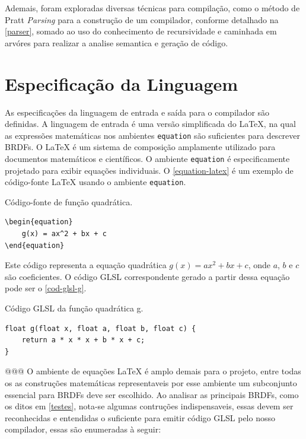 Ademais, foram exploradas diversas técnicas para compilação, como o método de Pratt \textit{Parsing} para a construção de um compilador, conforme detalhado na \autoref{parser}, somado ao uso do conhecimento de recursividade e caminhada em arvóres para realizar a analise semantica e geração de código.


\section{Especificação da Linguagem}\label{especificacao-linguagem}

As especificações da linguagem de entrada e saída para o compilador são definidas. A linguagem de entrada é uma versão simplificada do \LaTeX{}, na qual as expressões matemáticas nos ambientes \texttt{equation} são suficientes para descrever BRDFs. O \LaTeX{}  é um sistema de composição amplamente utilizado para documentos matemáticos e científicos. O ambiente \texttt{equation} é especificamente projetado para exibir equações individuais. O \autoref{equation-latex} é um exemplo de código-fonte \LaTeX{}  usando o ambiente \texttt{equation}.


\begin{codigo}[H]
\caption{\small Código-fonte de função quadrática.}
\label{equation-latex}
\begin{lstlisting}
\begin{equation}
    g(x) = ax^2 + bx + c
\end{equation}
\end{lstlisting}
\end{codigo}




Este código representa a equação quadrática \( g(x) = ax^2 + bx + c \), onde \( a \), \( b \) e \( c \) são coeficientes. O código GLSL correspondente gerado a partir dessa equação pode ser o \autoref{cod-glsl-g}.

\begin{codigo}[H]
\caption{\small Código GLSL da função quadrática g.}
\label{cod-glsl-g}
\begin{lstlisting}
float g(float x, float a, float b, float c) {
    return a * x * x + b * x + c;
}
\end{lstlisting}
\end{codigo}

@@@
O ambiente de equações \LaTeX{} é amplo demais para o projeto, entre todas os as construções matemáticas representaveis por esse ambiente um subconjunto essencial para BRDFs deve ser escolhido. Ao analisar as principais BRDFs, como os ditos em \autoref{testes}, nota-se algumas contruções indispensaveis, essas devem ser reconhecidas e entendidas o suficiente para emitir código GLSL pelo nosso 
compilador, essas são enumeradas à seguir:

